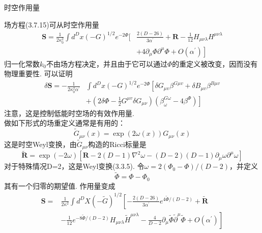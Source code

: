 \centerline{\Large 时空作用量}

场方程(3.7.15)可从时空作用量
\begin{equation}
	\begin{aligned}
		\boldsymbol{S}=\frac{1}{2 \kappa_{0}^{2}} \int d^{D} x(-G)^{1 / 2} e^{-2 \Phi}[& \frac{2(D-26)}{3 \alpha^{\prime}}+\boldsymbol{R}-\frac{1}{12} H_{\mu \nu \lambda} H^{\mu \nu \lambda} \\
		&\left.+4 \partial_{\mu} \Phi \partial^{\mu} \Phi+O\left(\alpha^{\prime}\right)\right]
	\end{aligned}
\end{equation}
归一化常数$k_0$不由场方程决定，并且由于它可以通过$\Phi$的重定义被改变，因而没有物理重要性. 可以证明
\begin{equation}
\begin{aligned}
\delta \boldsymbol{S}=-\frac{1}{2 \kappa_{0}^{2} \alpha^{\prime}} & \int d^{D} x(-G)^{1 / 2} e^{-2 \Phi}\left[\delta G_{\mu v} \beta^{G \mu v}+\delta B_{\mu v} \beta^{B \mu v}\right.\\
&\left.+\left(2 \delta \Phi-\frac{1}{2} G^{\mu v} \delta G_{\mu \nu}\right)\left(\beta_{\omega}^{G \omega}-4 \beta^{\Phi}\right)\right]
\end{aligned}
\end{equation}
注意，这是控制低能时空场的有效作用量. \\
做如下形式的场重定义通常是有用的：
\begin{equation}
\tilde{G}_{\mu \nu}(x)=\exp (2 \omega(x)) G_{\mu \nu}(x)
\end{equation}
这是时空Weyl变换，由$\tilde{G}_{\mu \nu}$构造的Ricci标量是
\begin{equation}
\tilde{\boldsymbol{R}}=\exp (-2 \omega)\left[\boldsymbol{R}-2(D-1) \nabla^{2} \omega-(D-2)(D-1) \partial_{\mu} \omega \partial^{\mu} \omega\right]
\end{equation}
对于特殊情况D=2，这是Weyl变换(3.3.5). 令$\omega=2\left(\Phi_{0}-\Phi\right) /(D-2)$，并定义
\begin{equation}
\tilde{\Phi}=\Phi-\Phi_{0}
\end{equation}
其有一个归零的期望值. 作用量变成
\begin{equation}
\begin{aligned}
\boldsymbol{S}=& \frac{1}{2 \kappa^{2}} \int d^{D} X(-\tilde{G})^{1 / 2}\left[-\frac{2(D-26)}{3 \alpha^{\prime}} e^{4 \tilde{\Phi} /(D-2)}+\tilde{\boldsymbol{R}}\right.\\
&\left.-\frac{1}{12} e^{-8 \tilde{\Phi} /(D-2)} H_{\mu \nu \lambda} \tilde{H}^{\mu \nu \lambda}-\frac{4}{D-2} \partial_{\mu} \tilde{\Phi} \tilde{\partial}^{\mu} \tilde{\Phi}+O\left(\alpha^{\prime}\right)\right]
\end{aligned}
\end{equation}

